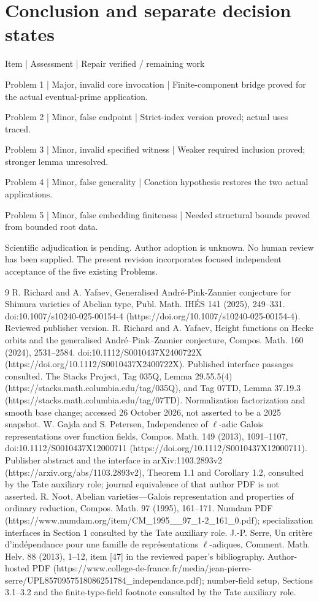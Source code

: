 \documentclass[10pt]{article}
\begin{document}
\section*{Conclusion and separate decision states}
Item | Assessment | Repair verified / remaining work\par
Problem 1 | Major, invalid core invocation | Finite-component bridge proved for the actual eventual-prime application.\par
Problem 2 | Minor, false endpoint | Strict-index version proved; actual uses traced.\par
Problem 3 | Minor, invalid specified witness | Weaker required inclusion proved; stronger lemma unresolved.\par
Problem 4 | Minor, false generality | Coaction hypothesis restores the two actual applications.\par
Problem 5 | Minor, false embedding finiteness | Needed structural bounds proved from bounded root data.\par
Scientific adjudication is pending. Author adoption is unknown. No human review has been supplied. The present revision incorporates focused independent acceptance of the five existing Problems.\par
9 R. Richard and A. Yafaev, Generalised André-Pink-Zannier conjecture for Shimura varieties of Abelian type, Publ. Math. IHÉS 141 (2025), 249–331. doi:10.1007/s10240-025-00154-4 (https://doi.org/10.1007/s10240-025-00154-4). Reviewed publisher version. R. Richard and A. Yafaev, Height functions on Hecke orbits and the generalised André–Pink–Zannier conjecture, Compos. Math. 160 (2024), 2531–2584. doi:10.1112/S0010437X2400722X (https://doi.org/10.1112/S0010437X2400722X). Published interface passages consulted. The Stacks Project, Tag 035Q, Lemma 29.55.5(4) (https://stacks.math.columbia.edu/tag/035Q), and Tag 07TD, Lemma 37.19.3 (https://stacks.math.columbia.edu/tag/07TD). Normalization factorization and smooth base change; accessed 26 October 2026, not asserted to be a 2025 snapshot. W. Gajda and S. Petersen, Independence of \(\ell\)-adic Galois representations over function fields, Compos. Math. 149 (2013), 1091–1107, doi:10.1112/S0010437X12000711 (https://doi.org/10.1112/S0010437X12000711). Publisher abstract and the interface in arXiv:1103.2893v2 (https://arxiv.org/abs/1103.2893v2), Theorem 1.1 and Corollary 1.2, consulted by the Tate auxiliary role; journal equivalence of that author PDF is not asserted. R. Noot, Abelian varieties—Galois representation and properties of ordinary reduction, Compos. Math. 97 (1995), 161–171. Numdam PDF (https://www.numdam.org/item/CM\_1995\_\_97\_1-2\_161\_0.pdf); specialization interfaces in Section 1 consulted by the Tate auxiliary role. J.-P. Serre, Un critère d’indépendance pour une famille de représentations \(\ell\)-adiques, Comment. Math. Helv. 88 (2013), 1–12, item [47] in the reviewed paper’s bibliography. Author-hosted PDF (https://www.college-de-france.fr/media/jean-pierre-serre/UPL8570957518086251784\_independance.pdf); number-field setup, Sections 3.1–3.2 and the finite-type-field footnote consulted by the Tate auxiliary role.\par
\end{document}
